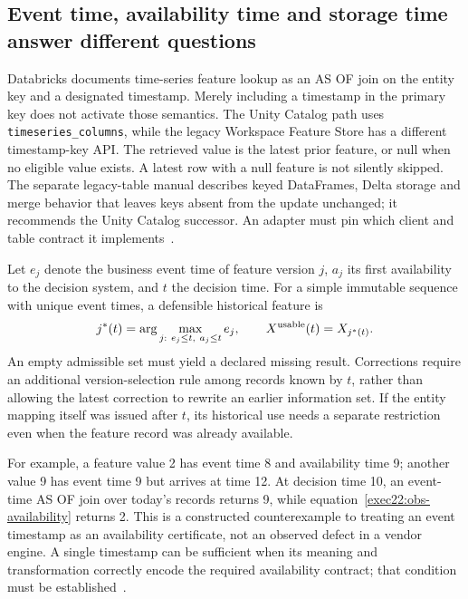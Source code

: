\subsection{Event time, availability time and storage time answer different questions}
\label{exec22:obs-clocks}

Databricks documents time-series feature lookup as an AS OF join on the entity
key and a designated timestamp. Merely including a timestamp in the primary key
does not activate those semantics. The Unity Catalog path uses
\texttt{timeseries\_columns}, while the legacy Workspace Feature Store has a
different timestamp-key API. The retrieved value is the latest prior feature,
or null when no eligible value exists. A latest row with a null feature is not
silently skipped. The separate legacy-table manual describes keyed DataFrames,
Delta storage and merge behavior that leaves keys absent from the update
unchanged; it recommends the Unity Catalog successor. An adapter must pin which
client and table contract it implements~\citep{exec22_obs_databricks_pit,exec22_obs_databricks_feature}.

Let $e_j$ denote the business event time of feature version $j$, $a_j$ its first
availability to the decision system, and $t$ the decision time. For a simple
immutable sequence with unique event times, a defensible historical feature is
\begin{equation}
 j^*(t)=\arg\max_{j:\ e_j\leq t,\ a_j\leq t} e_j,
 \qquad X^{\rm usable}(t)=X_{j^*(t)}.
 \label{exec22:obs-availability}
\end{equation}
An empty admissible set must yield a declared missing result. Corrections require
an additional version-selection rule among records known by $t$, rather than
allowing the latest correction to rewrite an earlier information set. If the
entity mapping itself was issued after $t$, its historical use needs a separate
restriction even when the feature record was already available.

For example, a feature value 2 has event time 8 and availability time 9; another
value 9 has event time 9 but arrives at time 12. At decision time 10, an event-time
AS OF join over today's records returns 9, while
equation~\eqref{exec22:obs-availability} returns 2. This is a constructed
counterexample to treating an event timestamp as an availability certificate,
not an observed defect in a vendor engine. A single timestamp can be sufficient
when its meaning and transformation correctly encode the required availability
contract; that condition must be established~\citep{exec22_obs_reference}.

